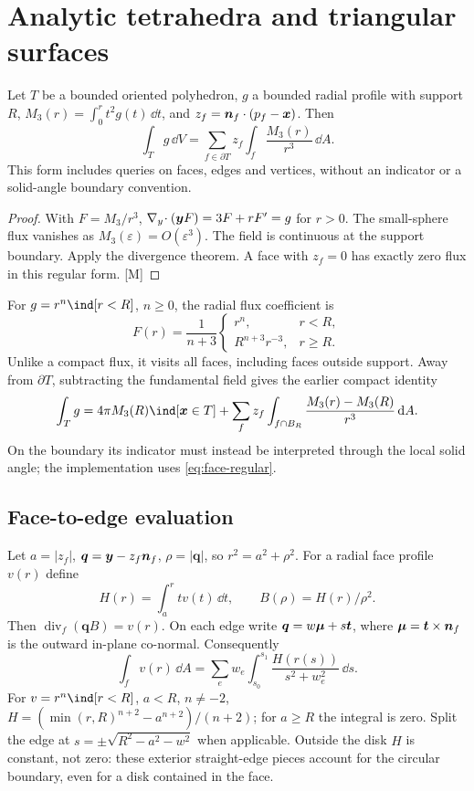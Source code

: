 \section{Analytic tetrahedra and triangular surfaces}\label{sec:threed}

\begin{theorem}\label{thm:face}
Let $T$ be a bounded oriented polyhedron, $g$ a bounded radial profile with
support $R$, $M_3(r)=\int_0^r t^2g(t)\,\dd t$, and
$z_f=\bm n_f\cdot(p_f-\bm x)$. Then
\begin{equation}\label{eq:face-regular}
 \int_Tg\,\dd V=\sum_{f\in\partial T}z_f\int_f\frac{M_3(r)}{r^3}\,\dd A.
\end{equation}
This form includes queries on faces, edges and vertices, without an indicator
or a solid-angle boundary convention.
\end{theorem}
\begin{proof}
With $F=M_3/r^3$, $\nabla_y\!\cdot(\bm y F)=3F+rF'=g$ for $r>0$.
The small-sphere flux vanishes as $M_3(\varepsilon)=O(\varepsilon^3)$.
The field is continuous at the support boundary. Apply the divergence theorem.
A face with $z_f=0$ has exactly zero flux in this regular form. [M]
\end{proof}
For $g=r^n\ind[r<R]$, $n\ge0$, the radial flux coefficient is
\[
 F(r)=\frac1{n+3}\begin{cases}r^n,&r<R,\\R^{n+3}r^{-3},&r\ge R.\end{cases}
\]
Unlike a compact flux, it visits all faces, including faces outside support.
Away from $\partial T$, subtracting the fundamental field gives the earlier
compact identity
\[
 \int_Tg=4\pi M_3(R)\ind[\xx\in T]
 +\sum_f z_f\int_{f\cap B_R}\frac{M_3(r)-M_3(R)}{r^3}\,\dd A.
\]
On the boundary its indicator must instead be interpreted through the local
solid angle; the implementation uses \cref{eq:face-regular}.

\subsection{Face-to-edge evaluation}
Let $a=|z_f|$, $\bm q=\bm y-z_f\bm n_f$, $\rho=|\bm q|$, so $r^2=a^2+\rho^2$.
For a radial face profile $v(r)$ define
\[
 H(r)=\int_a^r t v(t)\,\dd t,\qquad B(\rho)=H(r)/\rho^2.
\]
Then $\operatorname{div}_f(\bm q B)=v(r)$. On each edge write
$\bm q=w\bm\mu+s\bm t$, where $\bm\mu=\bm t\times\bm n_f$ is the outward
in-plane co-normal. Consequently
\begin{equation}\label{eq:face-edge-regular}
 \int_f v(r)\,\dd A=\sum_e w_e\int_{s_0}^{s_1}
                  \frac{H(r(s))}{s^2+w_e^2}\,\dd s.
\end{equation}
For $v=r^n\ind[r<R]$, $a<R$, $n\ne-2$,
$H=(\min(r,R)^{n+2}-a^{n+2})/(n+2)$; for $a\ge R$ the integral is zero.
Split the edge at $s=\pm\sqrt{R^2-a^2-w^2}$ when applicable.
Outside the disk $H$ is constant, not zero: these exterior straight-edge
pieces account for the circular boundary, even for a disk contained in the face.

